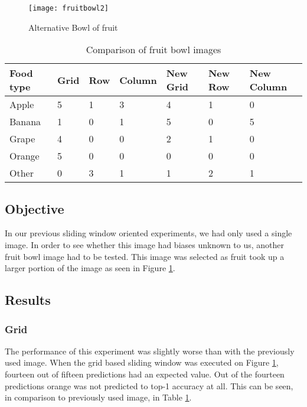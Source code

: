 \begin{figure}
    \texttt{[image: fruitbowl2]}
    \caption{Alternative Bowl of fruit}
    \label{fig:newFruit}
\end{figure}

\begin{table}[]
    \centering
    \caption{Comparison of fruit bowl images}
    \label{newFruitTable}
    \begin{tabular}{|l|l|l|l|l|l|l|}
    \hline
        \textbf{Food type} & \textbf{Grid} & \textbf{Row} & \textbf{Column} & \textbf{New Grid} & \textbf{New Row} & \textbf{New Column} \\ \hline
        Apple     & 5    & 1   & 3      & 4        & 1       & 0          \\ \hline
        Banana    & 1    & 0   & 1      & 5        & 0       & 5          \\ \hline
        Grape     & 4    & 0   & 0      & 2        & 1       & 0          \\ \hline
        Orange    & 5    & 0   & 0      & 0        & 0       & 0          \\ \hline
        Other     & 0    & 3   & 1      & 1        & 2       & 1         \\ \hline
    \end{tabular}
\end{table}

\subsection*{Objective}
In our previous sliding window oriented experiments, we had only used a
single image. In order to see whether this image had biases unknown
to us, another fruit bowl image had to be tested. This image was selected as
fruit took up a larger portion of the image as seen in Figure \ref{fig:newFruit}.

\subsection*{Results}
\subsubsection*{Grid}
The performance of this experiment was slightly worse than with the previously
used image. When the grid based sliding window was executed on Figure
\ref{fig:newFruit}, fourteen out of fifteen predictions had an expected value.
Out of the fourteen predictions orange was not predicted to top-1 accuracy at
all. This can be seen, in comparison to previously used image, in Table
\ref{newFruitTable}.

